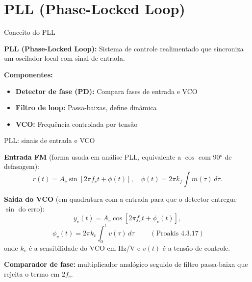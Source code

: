 

\section{PLL (Phase-Locked Loop)}

\begin{frame}{Conceito do PLL}

\small

\textbf{PLL (Phase-Locked Loop):} Sistema de controle realimentado que sincroniza um oscilador local com sinal de entrada.

\begin{center}
\end{center}

\textbf{Componentes:}
\begin{itemize}
\item \textbf{Detector de fase (PD):} Compara fases de entrada e VCO
\item \textbf{Filtro de loop:} Passa-baixas, define dinâmica
\item \textbf{VCO:} Frequência controlada por tensão
\end{itemize}

\end{frame}


\begin{frame}{PLL: sinais de entrada e VCO}

\textbf{Entrada FM} (forma usada em análise PLL, equivalente a $\cos$ com 90° de defasagem):
\[
r(t) = A_c \sin[2\pi f_c t + \phi(t)], \quad \phi(t) = 2\pi k_f\!\int m(\tau)\,d\tau.
\]

\pause
\textbf{Saída do VCO} (em quadratura com a entrada para que o detector entregue $\sin$ do erro):
\[
y_v(t) = A_v \cos[2\pi f_c t + \phi_v(t)],
\]
\[
\boxed{\;\phi_v(t) = 2\pi k_v \int_0^t v(\tau)\,d\tau\;} \qquad (\text{Proakis 4.3.17})
\]
onde $k_v$ é a sensibilidade do VCO em Hz/V e $v(t)$ é a tensão de controle.

\pause
\textbf{Comparador de fase:} multiplicador analógico seguido de filtro passa-baixa que rejeita o termo em $2 f_c$.

\end{frame}

